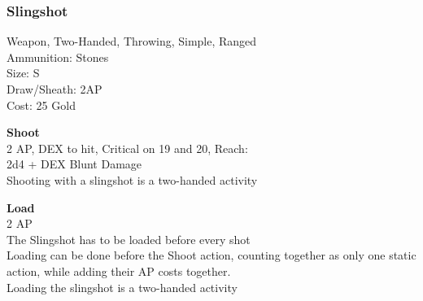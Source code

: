 \subsubsection{Slingshot}\label{weapon:slingshot}
Weapon, Two-Handed, Throwing, Simple, Ranged\\
Ammunition: Stones\\
Size: S\\
Draw/Sheath: 2AP\\
Cost: 25 Gold

\textbf{Shoot}\\
2 AP, DEX to hit, Critical on 19 and 20,  Reach:\\
2d4 + \texttimes DEX Blunt Damage\\
Shooting with a slingshot is a two-handed activity

\textbf{Load}\\
2 AP\\
The Slingshot has to be loaded before every shot\\
Loading can be done before the Shoot action, counting together as only one static action, while adding their AP costs together.\\
Loading the slingshot is a two-handed activity
